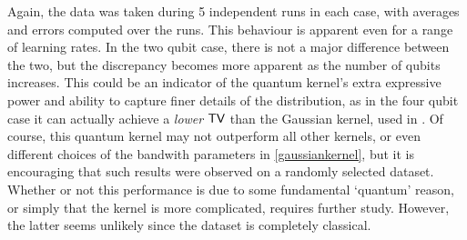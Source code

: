 Again, the data was taken during 5 independent runs in each case, with averages and errors computed over the runs. This behaviour is apparent even for a range of learning rates. In the two qubit case, there is not a major difference between the two, but the discrepancy becomes more apparent as the number of qubits increases. This could be an indicator of the quantum kernel's extra expressive power and ability to capture finer details of the distribution, as in the four qubit case it can actually achieve a \textit{lower} $\operatorname{\textsf{TV}}$ than the Gaussian kernel, used in . Of course, this quantum kernel may not outperform all other kernels, or even different choices of the bandwith parameters in \eqref{gaussiankernel}, but it is encouraging that such results were observed on a randomly selected dataset. Whether or not this performance is due to some fundamental `quantum' reason, or simply that the kernel is more complicated, requires further study. However, the latter seems unlikely since the dataset is completely classical.

